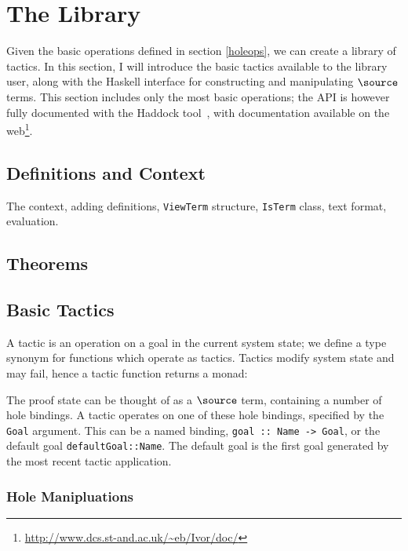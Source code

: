 \section{The \Ivor{} Library}

Given the basic operations defined in section \ref{holeops}, we can
create a library of tactics. In this section, I will introduce the
basic tactics available to the library user, along with the Haskell
interface for constructing and manipulating $\source$ terms. This
section includes only the most basic operations; the API is however
fully documented with the Haddock tool~\cite{haddock}, with
documentation available on the web\footnote{\url{http://www.dcs.st-and.ac.uk/~eb/Ivor/doc/}}.

\subsection{Definitions and Context}

The context, adding definitions, \texttt{ViewTerm} structure,
\texttt{IsTerm} class, text format, evaluation.

\subsection{Theorems}


\subsection{Basic Tactics}

A tactic is an operation on a goal in the current system state; we
define a type synonym  for functions which operate as
tactics. Tactics modify system state and may fail, hence a tactic
function returns a monad:


The proof state can be thought of as a $\source$ term, containing a
number of hole bindings. A tactic operates on one of these hole
bindings, specified by the \texttt{Goal} argument. This can be a named
binding, \texttt{goal :: Name -> Goal}, or the default goal
\texttt{defaultGoal::Name}. The default goal is the first goal
generated by the most recent tactic application.

\subsubsection{Hole Manipluations}

